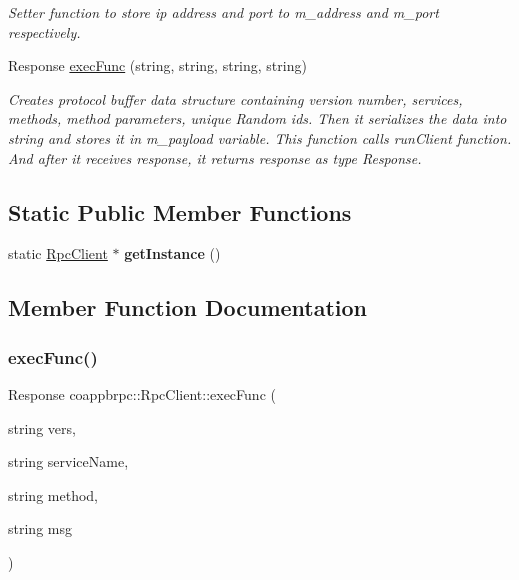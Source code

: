 \begin{DoxyCompactItemize}
\begin{DoxyCompactList}\small\item\em Setter function to store ip address and port to m\+\_\+address and m\+\_\+port respectively. \end{DoxyCompactList}\item 
Response \hyperlink{classcoappbrpc_1_1RpcClient_afe2dc0caa49442db4898379d040c8b64}{exec\+Func} (string, string, string, string)
\begin{DoxyCompactList}\small\item\em Creates protocol buffer data structure containing version number, services, methods, method parameters, unique Random ids. Then it serializes the data into string and stores it in m\+\_\+payload variable. This function calls run\+Client function. And after it receives response, it returns response as type Response. \end{DoxyCompactList}\end{DoxyCompactItemize}
\subsection*{Static Public Member Functions}
\begin{DoxyCompactItemize}
\item 
\mbox{\label{classcoappbrpc_1_1RpcClient_a36bb0e75fae00e4ea9e643d8c1b16f5c}} 
static \hyperlink{classcoappbrpc_1_1RpcClient}{Rpc\+Client} $\ast$ {\bfseries get\+Instance} ()
\end{DoxyCompactItemize}


\subsection{Member Function Documentation}
\mbox{\label{classcoappbrpc_1_1RpcClient_afe2dc0caa49442db4898379d040c8b64}} 
\subsubsection{\texorpdfstring{exec\+Func()}{execFunc()}}
{\footnotesize\ttfamily Response coappbrpc\+::\+Rpc\+Client\+::exec\+Func (\begin{DoxyParamCaption}\item[{string}]{vers,  }\item[{string}]{service\+Name,  }\item[{string}]{method,  }\item[{string}]{msg }\end{DoxyParamCaption})}



